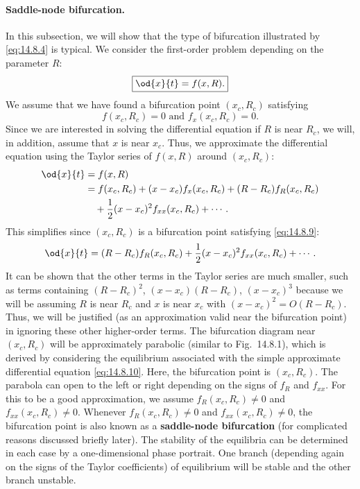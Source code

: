 \paragraph{Saddle-node bifurcation.}
In this subsection, we will show that the type of bifurcation illustrated by \eqref{eq:14.8.4} is typical. We consider the first-order problem depending on the parameter $R$:
\begin{equation}
\boxed{\od{x}{t} = f(x, R).}
\label{eq:14.8.8}
\end{equation}
We assume that we have found a bifurcation point $(x_c, R_c)$ satisfying
\begin{equation}
\boxed{f(x_c, R_c) = 0 \text{ and } f_x(x_c, R_c) = 0.}
\label{eq:14.8.9}
\end{equation}
Since we are interested in solving the differential equation if $R$ is near $R_c$, we will, in addition, assume that $x$ is near $x_c$. Thus, we approximate the differential equation using the Taylor series of $f(x,R)$ around $(x_c, R_c)$:
\begin{align}
\od{x}{t} &= f(x,R) \notag \\
&= f(x_c, R_c) + (x - x_c)f_x(x_c, R_c) + (R - R_c)f_R(x_c, R_c) \notag \\
&\quad + \frac{1}{2}(x - x_c)^2 f_{xx}(x_c, R_c) + \cdots.
\end{align}
This simplifies since $(x_c, R_c)$ is a bifurcation point satisfying \eqref{eq:14.8.9}:
\begin{equation}
\od{x}{t} = (R - R_c)f_R(x_c, R_c) + \frac{1}{2}(x - x_c)^2 f_{xx}(x_c, R_c) + \cdots.
\label{eq:14.8.10}
\end{equation}
It can be shown that the other terms in the Taylor series are much smaller, such as terms containing $(R - R_c)^2$, $(x - x_c)(R - R_c)$, $(x - x_c)^3$ because we will be assuming $R$ is near $R_c$ and $x$ is near $x_c$ with $(x - x_c)^2 = O(R - R_c)$. Thus, we will be justified (as an approximation valid near the bifurcation point) in ignoring these other higher-order terms. The bifurcation diagram near $(x_c, R_c)$ will be approximately parabolic (similar to Fig.\ 14.8.1), which is derived by considering the equilibrium associated with the simple approximate differential equation \eqref{eq:14.8.10}. Here, the bifurcation point is $(x_c, R_c)$. The parabola can open to the left or right depending on the signs of $f_R$ and $f_{xx}$. For this to be a good approximation, we assume $f_R(x_c, R_c) \neq 0$ and $f_{xx}(x_c, R_c) \neq 0$. Whenever $f_R(x_c, R_c) \neq 0$ and $f_{xx}(x_c, R_c) \neq 0$, the bifurcation point is also known as a \textbf{saddle-node bifurcation} (for complicated reasons discussed briefly later). The stability of the equilibria can be determined in each case by a one-dimensional phase portrait. One branch (depending again on the signs of the Taylor coefficients) of equilibrium will be stable and the other branch unstable.

